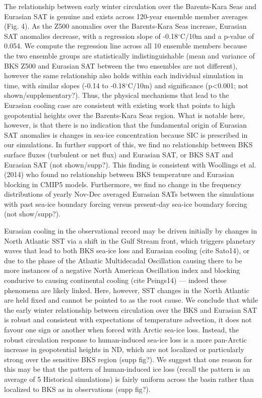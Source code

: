 \documentclass[grl]{AGUTeX}  %
\begin{document}
\begin{article}
The relationship between early winter circulation over the Barents-Kara Seas and Eurasian SAT is genuine and exists across 120-year ensemble member averages (Fig. 4). As the Z500 anomalies over the Barents-Kara Seas increase, Eurasian SAT anomalies decrease, with a regression slope of -0.18$^\circ$C/10m and a p-value of 0.054. We compute the regression line across all 10 ensemble members because the two ensemble groups are statistically indistinguishable (mean and variance of BKS Z500 and Eurasian SAT between the two ensembles are not different), however the same relationship also holds within each individual simulation in time, with similar slopes (-0.14 to -0.18$^\circ$C/10m) and significance (p<0.001; not shown/supplementary?). Thus, the physical mechanisms that lead to the Eurasian cooling case are consistent with existing work that points to high geopotential heights over the Barents-Kara Seas region. What is notable here, however, is that there is no indication that the fundamental origin of Eurasian SAT anomalies is changes in sea-ice concentration because SIC is prescribed in our simulations. In further support of this, we find no relationship between BKS surface fluxes (turbulent or net flux) and Eurasian SAT, or BKS SAT and Eurasian SAT (not shown/supp?). This finding is consistent with Woollings et al. (2014) who found no relationship between BKS temperature and Eurasian blocking in CMIP5 models. Furthermore, we find no change in the frequency distributions of yearly Nov-Dec averaged Eurasian SATs between the simulations with past sea-ice boundary forcing versus present-day sea-ice boundary forcing (not show/supp?).

Eurasian cooling in the observational record may be driven initially by changes in North Atlantic SST via a shift in the Gulf Stream front, which triggers planetary waves that lead to both BKS sea-ice loss and Eurasian cooling (cite Sato14), or due to the phase of the Atlantic Multidecadal Oscillation causing there to be more instances of a negative North American Oscillation index and blocking conducive to causing continental cooling (cite Peings14) --- indeed these phenomena are likely linked. Here, however, SST changes in the North Atlantic are held fixed and cannot be pointed to as the root cause. We conclude that while the early winter relationship between circulation over the BKS and Eurasian SAT is robust and consistent with expectations of temperature advection, it does not favour one sign or another when forced with Arctic sea-ice loss. Instead, the robust circulation response to human-induced sea-ice loss is a more pan-Arctic increase in geopotential heights in ND, which are not localized or particularly strong over the sensitive BKS region (supp fig?). We suggest that one reason for this may be that the pattern of human-induced ice loss (recall the pattern is an average of 5 Historical simulations) is fairly uniform across the basin rather than localized to BKS as in observations (supp fig?).


\end{article}
\end{document}
